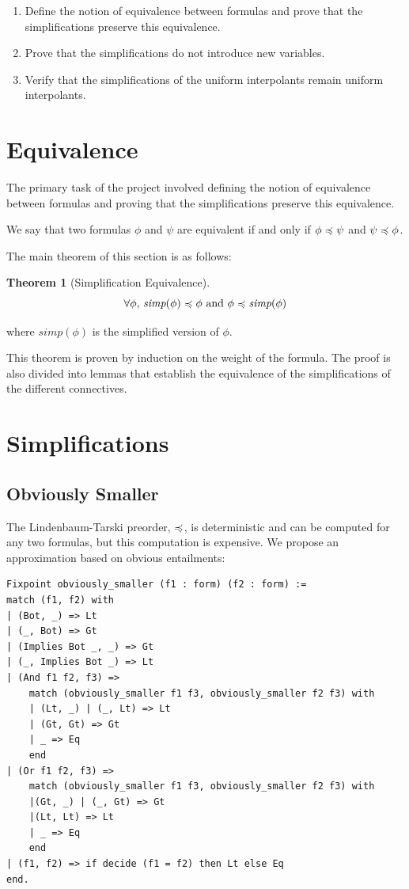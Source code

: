 \documentclass{article}
\newtheorem{theorem}{Theorem}[section]
\begin{document}
\begin{enumerate}
	\item Define the notion of equivalence between formulas and prove that the simplifications preserve this equivalence.
	\item Prove that the simplifications do not introduce new variables.
	\item Verify that the simplifications of the uniform interpolants remain uniform interpolants.
\end{enumerate}

\section{Equivalence}

The primary task of the project involved defining the notion of equivalence between formulas and proving that the simplifications preserve this equivalence.

We say that two formulas $\phi$ and $\psi$ are equivalent if and only if $\phi \preccurlyeq \psi$ and $\psi \preccurlyeq \phi$.

The main theorem of this section is as follows:

\begin{theorem}[Simplification Equivalence]
	\[
		\forall \phi,\, \textit{simp}(\phi) \preccurlyeq \phi \text{ and } \phi \preccurlyeq \textit{simp}(\phi)
	\]
\end{theorem}

where $\textit{simp}(\phi)$ is the simplified version of $\phi$.

This theorem is proven by induction on the weight of the formula. The proof is also divided into lemmas that
establish the equivalence of the simplifications of the different connectives.

\section{Simplifications}

\subsection{Obviously Smaller}

The Lindenbaum-Tarski preorder, $\preccurlyeq$, is deterministic and can be computed for any two formulas, but this
computation is expensive. We propose an approximation based on obvious entailments:

\begin{lstlisting}[language=Coq]
Fixpoint obviously_smaller (f1 : form) (f2 : form) :=
match (f1, f2) with
| (Bot, _) => Lt
| (_, Bot) => Gt
| (Implies Bot _, _) => Gt
| (_, Implies Bot _) => Lt
| (And f1 f2, f3) =>
    match (obviously_smaller f1 f3, obviously_smaller f2 f3) with
    | (Lt, _) | (_, Lt) => Lt
    | (Gt, Gt) => Gt
    | _ => Eq
    end
| (Or f1 f2, f3) =>
    match (obviously_smaller f1 f3, obviously_smaller f2 f3) with
    |(Gt, _) | (_, Gt) => Gt
    |(Lt, Lt) => Lt
    | _ => Eq
    end
| (f1, f2) => if decide (f1 = f2) then Lt else Eq
end.
\end{lstlisting}
\end{document}
